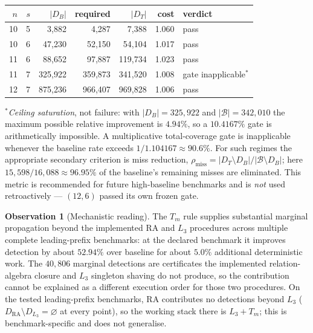 \documentclass[11pt,a4paper]{article}
\theoremstyle{definition}
\newtheorem{observation}[theorem]{Observation}
\begin{document}
\begin{center}
\begin{tabular}{@{}rrrrrrl@{}}
\toprule
$n$ & $s$ & $|D_B|$ & required & $|D_T|$ & cost & verdict \\
\midrule
10 & 5 & 3{,}882 & 4{,}287 & 7{,}388 & 1.060 & pass \\
10 & 6 & 47{,}230 & 52{,}150 & 54{,}104 & 1.017 & pass \\
11 & 6 & 88{,}652 & 97{,}887 & 119{,}734 & 1.023 & pass \\
11 & 7 & 325{,}922 & 359{,}873 & 341{,}520 & 1.008 & gate inapplicable$^\ast$ \\
12 & 7 & 875{,}236 & 966{,}407 & 969{,}828 & 1.006 & pass \\
\bottomrule
\end{tabular}
\end{center}

\noindent$^\ast$\emph{Ceiling saturation}, not failure: with
$|D_B|=325{,}922$ and $|\mathcal B|=342{,}010$ the maximum possible relative
improvement is $4.94\%$, so a $10.4167\%$ gate is arithmetically impossible. A
multiplicative total-coverage gate is inapplicable whenever the baseline rate
exceeds $1/1.104167\approx90.6\%$. For such regimes the appropriate secondary
criterion is miss reduction,
$\rho_{\mathrm{miss}}=|D_T\setminus D_B|/|\mathcal B\setminus D_B|$; here
$15{,}598/16{,}088\approx96.95\%$ of the baseline's remaining misses are
eliminated. This metric is recommended for future high-baseline benchmarks and is
\emph{not} used retroactively --- $(12,6)$ passed its own frozen gate.

\begin{observation}[Mechanistic reading]
\label{obs:f3}
The $T_m$ rule supplies substantial marginal propagation beyond the implemented
RA and $L_3$ procedures across multiple complete leading-prefix benchmarks: at the
declared benchmark it improves detection by about $52.94\%$ over baseline for
about $5.0\%$ additional deterministic work. The $40{,}806$ marginal detections
are certificates the implemented relation-algebra closure and $L_3$ singleton
shaving do not produce, so the contribution cannot be explained as a different
execution order for those two procedures. On the tested leading-prefix
benchmarks, RA contributes no detections beyond $L_3$
($D_{\mathrm{RA}}\setminus D_{L_3}=\varnothing$ at every point), so the working
stack there is $L_3+T_m$; this is benchmark-specific and does not generalise.
\end{observation}
\end{document}
